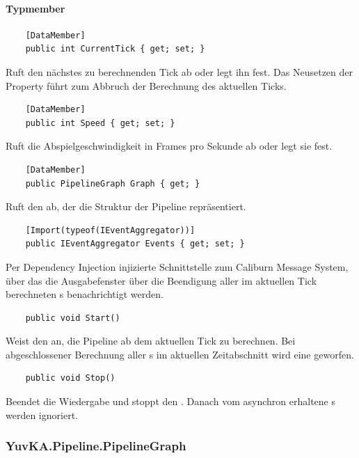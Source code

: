 \paragraph{Typmember}
\begin{itemize}

	\begin{verbatim}
	[DataMember]
	public int CurrentTick { get; set; }
	\end{verbatim} 
	Ruft den nächstes zu berechnenden Tick ab oder legt ihn fest. Das Neusetzen der Property führt zum Abbruch der Berechnung des aktuellen Ticks.

	\begin{verbatim}
	[DataMember]
	public int Speed { get; set; }
	\end{verbatim}
	Ruft die Abspielgeschwindigkeit in Frames pro Sekunde ab oder legt sie fest.

	\begin{verbatim}
	[DataMember]
	public PipelineGraph Graph { get; }
	\end{verbatim}
	Ruft den  ab, der die Struktur der Pipeline repräsentiert.

	\begin{verbatim}
	[Import(typeof(IEventAggregator))]
	public IEventAggregator Events { get; set; }
	\end{verbatim}
	Per Dependency Injection injizierte Schnittstelle zum Caliburn Message System, über das die Ausgabefenster über die Beendigung aller im aktuellen Tick berechneten s benachrichtigt werden.



	\begin{verbatim}
	public void Start()
	\end{verbatim}
	Weist den  an, die Pipeline ab dem aktuellen Tick zu berechnen. Bei abgeschlossener Berechnung aller s im aktuellen Zeitabschnitt wird eine  geworfen.

	\begin{verbatim}
	public void Stop()
	\end{verbatim}
	Beendet die Wiedergabe und stoppt den . Danach vom  asynchron erhaltene s werden ignoriert.
\end{itemize}

\subsubsection{YuvKA.Pipeline.PipelineGraph}
	
